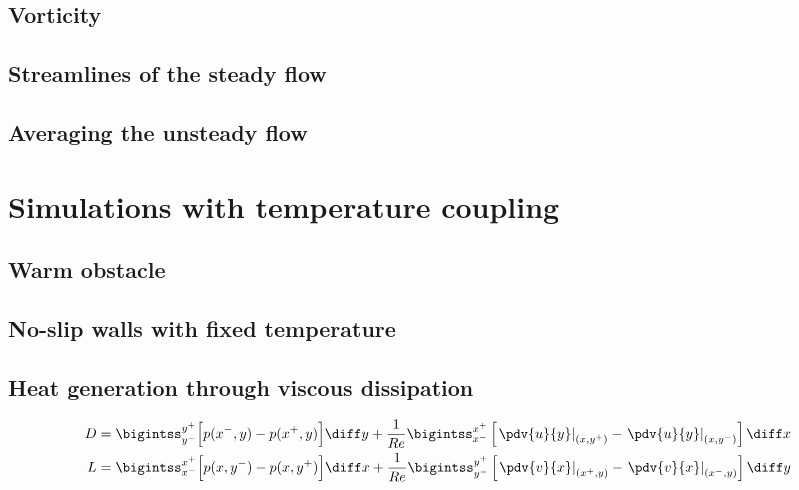 \documentclass[11 pt]{article}
\begin{document}
\subsection{Vorticity}

\subsection{Streamlines of the steady flow}

\subsection{Averaging the unsteady flow}


\section{Simulations with temperature coupling}
\subsection{Warm obstacle}

\subsection{No-slip walls with fixed temperature}

\subsection{Heat generation through viscous dissipation}

\newpage
\begin{align*}
    D &= \bigintss_{y^-}^{y^+} \Big[p(x^-, y) - p(x^+, y)\Big] \diff y + \frac{1}{Re} \bigintss_{x^-}^{x^+} \left[ \left.\pdv{u}{y}\right|_{(x, y^+)} - \left.\pdv{u}{y}\right|_{(x, y^-)} \right] \diff x\\
    L &= \bigintss_{x^-}^{x^+} \Big[p(x, y^-) - p(x, y^+)\Big] \diff x + \frac{1}{Re} \bigintss_{y^-}^{y^+} \left[ \left.\pdv{v}{x}\right|_{(x^+, y)} - \left.\pdv{v}{x}\right|_{(x^-, y)} \right] \diff y
\end{align*}

\nocite{*}
\printbibliography
\end{document}

